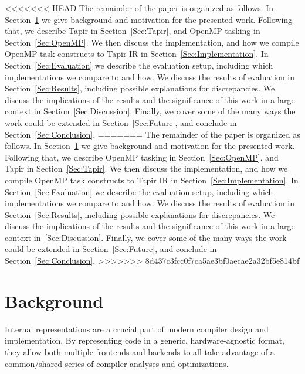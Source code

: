 \documentclass[sigconf]{acmart}
\begin{document}
<<<<<<< HEAD
The remainder of the paper is organized as follows.  In
Section~\ref{Sec:Background} we give background and motivation for the
presented work. Following that, we describe Tapir in Section~\ref{Sec:Tapir},
and OpenMP tasking in Section~\ref{Sec:OpenMP}.  We then discuss the
implementation, and how we compile OpenMP task constructs to Tapir IR in
Section~\ref{Sec:Implementation}. In Section~\ref{Sec:Evaluation} we describe
the evaluation setup, including which implementations we compare to and
how. We discuss the results of evaluation in Section~\ref{Sec:Results},
including possible explanations for discrepancies. We discuss the implications
of the results and the significance of this work in a large context
in Section~\ref{Sec:Discussion}. Finally, we cover some of the many ways the work
could be extended in Section~\ref{Sec:Future}, and conclude in
Section~\ref{Sec:Conclusion}.
=======
The remainder of the paper is organized as follows.  In Section~\ref{Sec:Background}
we give background and motivation for the presented work. Following that, we describe OpenMP
tasking in Section~\ref{Sec:OpenMP}, and Tapir in Section~\ref{Sec:Tapir}. We then
discuss the implementation, and how we compile OpenMP task constructs to Tapir IR in
Section~\ref{Sec:Implementation}. In Section~\ref{Sec:Evaluation} we describe the
evaluation setup, including which implementations we compare to and how. We discuss
the results of evaluation in Section~\ref{Sec:Results}, including possible
explanations for discrepancies. We discuss the implications of the results and the
significance of this work in a large context in~\ref{Sec:Discussion}. Finally,
we cover some of the many ways the work could be extended in
Section~\ref{Sec:Future}, and conclude in Section~\ref{Sec:Conclusion}.
>>>>>>> 8d437c3fcc0f7ca5ae3bf0aecae2a32bf5e814bf

\section{Background} \label{Sec:Background}

Internal representations are a crucial part of modern compiler design and implementation.  By
representing code in a generic, hardware-agnostic format, they allow both
multiple frontends and backends to all take advantage of a common/shared series of compiler
analyses and optimizations.
\end{document}
